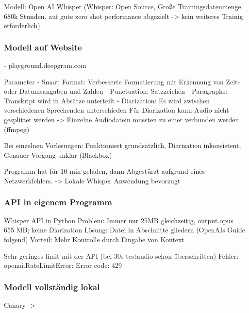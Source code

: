 Modell: Open AI Whisper \citep{whisper}
(Whisper: Open Source, Große Trainingsdatenmenge 680k Stunden, auf gute zero shot performance abgezielt -> kein weiteres Trainig erforderlich)

\subsubsection{Modell auf Website}

- playground.deepgram.com

Parameter
- Smart Format: Verbesserte Formatierung mit Erkennung von Zeit- oder Datumsangaben und Zahlen
- Punctuation: Satzzeichen
- Paragraphs: Transkript wird in Absätze unterteilt
- Diarization: Es wird zwischen verschiedenen Sprechenden unterschieden
Für Diarization kann Audio nicht gesplittet werden -> Einzelne Audiodatein mussten zu einer verbunden werden (ffmpeg)

Bei einzelnen Vorlesungen: Funktioniert grundsätzlich, Diarization inkonsistent, Genauer Vorgang unklar (Blackbox)

Programm hat für 10 min geladen, dann Abgestürzt aufgrund eines Netzwerkfehlers.
-> Lokale Whisper Anwendung bevorzugt


\subsubsection{API in eigenem Programm}

Whisper API in Python 
Problem: Immer nur 25MB gleichzeitig, output.opus  = 655 MB; keine Diarization 
Lösung: Datei in Abschnitte gliedern (OpenAIs Guide folgend)
Vorteil: Mehr Kontrolle durch Eingabe von Kontext

Sehr geringes limit mit der API (bei 30s testaudio schon überschritten)
Fehler: openai.RateLimitError: Error code: 429

\subsubsection{Modell vollständig lokal}
Canary  ->

